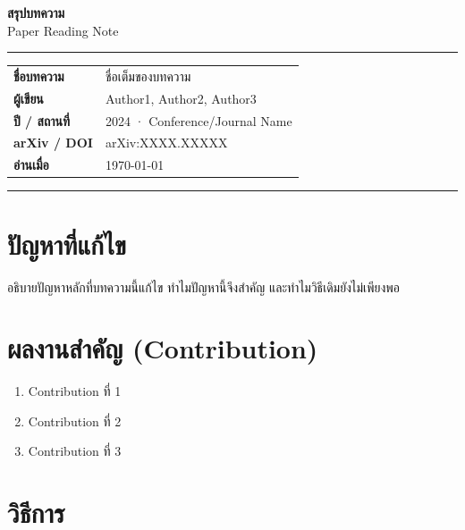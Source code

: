 \documentclass[10pt,a4paper]{article}
\begin{document}
\begin{center}
  {\LARGE \textbf{สรุปบทความ}}\\[6pt]
  {\color{muted}\small Paper Reading Note}
\end{center}

\noindent\rule{\textwidth}{1.5pt}

\vspace{12pt}
\noindent
\begin{tabular}{@{}ll@{}}
  \textbf{ชื่อบทความ}  & ชื่อเต็มของบทความ \\[4pt]
  \textbf{ผู้เขียน}    & Author1, Author2, Author3 \\[4pt]
  \textbf{ปี / สถานที่} & 2024 · Conference/Journal Name \\[4pt]
  \textbf{arXiv / DOI}  & arXiv:XXXX.XXXXX \\[4pt]
  \textbf{อ่านเมื่อ}   & \today \\
\end{tabular}

\vspace{12pt}
\noindent\rule{\textwidth}{0.4pt}

\section*{ปัญหาที่แก้ไข}

อธิบายปัญหาหลักที่บทความนี้แก้ไข ทำไมปัญหานี้จึงสำคัญ
และทำไมวิธีเดิมยังไม่เพียงพอ

\section*{ผลงานสำคัญ (Contribution)}

\begin{enumerate}[nosep, leftmargin=2em]
  \item Contribution ที่ 1
  \item Contribution ที่ 2
  \item Contribution ที่ 3
\end{enumerate}

\section*{วิธีการ}
\end{document}

